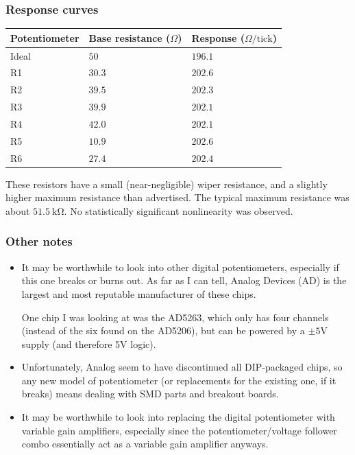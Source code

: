 \documentclass{article}
\begin{document}
        \subsubsection*{Response curves}
        \begin{tabular}{lll}
            \toprule
            Potentiometer & Base resistance ($\Omega$) & Response ($\Omega/\text{tick}$) \\ \midrule
            Ideal & $50$ & $196.1$ \\
            R1 & $30.3$ & $202.6$ \\
            R2 & $39.5$ & $202.3$ \\
            R3 & $39.9$ & $202.1$ \\
            R4 & $42.0$ & $202.1$ \\
            R5 & $10.9$ & $202.6$ \\
            R6 & $27.4$ & $202.4$ \\\bottomrule
        \end{tabular}\vspace{1em}

        \noindent These resistors have a small (near-negligible) wiper resistance, and a slightly higher maximum resistance than advertised. The typical maximum resistance was about $\SI{51.5}{\kilo\ohm}$. No statistically significant nonlinearity was observed.

        \subsubsection*{Other notes}
        \begin{itemize}
            \item It may be worthwhile to look into other digital potentiometers, especially if this one breaks or burns out. As far as I can tell, Analog Devices (AD) is the largest and most reputable manufacturer of these chips.
            
            One chip I was looking at was the AD5263, which only has four channels (instead of the six found on the AD5206), but can be powered by a $\pm5$V supply (and therefore 5V logic).

            \item Unfortunately, Analog seem to have discontinued all DIP-packaged chips, so any new model of potentiometer (or replacements for the existing one, if it breaks) means dealing with SMD parts and breakout boards.
            
            \item It may be worthwhile to look into replacing the digital potentiometer with variable gain amplifiers, especially since the potentiometer/voltage follower combo essentially act as a variable gain amplifier anyways.
        \end{itemize}
\end{document}
